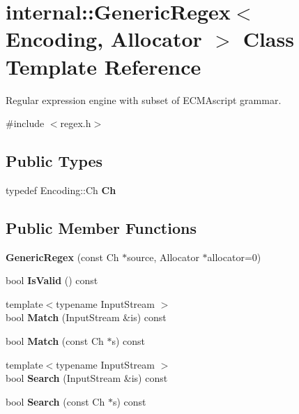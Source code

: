 \hypertarget{classinternal_1_1GenericRegex}{}\section{internal\+:\+:Generic\+Regex$<$ Encoding, Allocator $>$ Class Template Reference}
\label{classinternal_1_1GenericRegex}


Regular expression engine with subset of E\+C\+M\+Ascript grammar.  




{\ttfamily \#include $<$regex.\+h$>$}

\subsection*{Public Types}
\begin{DoxyCompactItemize}
\item 
\mbox{\label{classinternal_1_1GenericRegex_a44e1a86ec27e1c5628a7d91c8c3daace}} 
typedef Encoding\+::\+Ch {\bfseries Ch}
\end{DoxyCompactItemize}
\subsection*{Public Member Functions}
\begin{DoxyCompactItemize}
\item 
\mbox{\label{classinternal_1_1GenericRegex_a35c3a49bc4545a991ab039858227df0f}} 
{\bfseries Generic\+Regex} (const Ch $\ast$source, Allocator $\ast$allocator=0)
\item 
\mbox{\label{classinternal_1_1GenericRegex_a34ddb18fa3a2c70203d0fb740443c2a8}} 
bool {\bfseries Is\+Valid} () const
\item 
\mbox{\label{classinternal_1_1GenericRegex_ac2afbb42c4280a88fbb7d6ba78dfe863}} 
{\footnotesize template$<$typename Input\+Stream $>$ }\\bool {\bfseries Match} (Input\+Stream \&is) const
\item 
\mbox{\label{classinternal_1_1GenericRegex_a24c54a41023bad6c29d36775c6479d17}} 
bool {\bfseries Match} (const Ch $\ast$s) const
\item 
\mbox{\label{classinternal_1_1GenericRegex_a97f202c0a25aff38ec9bf484cd072a74}} 
{\footnotesize template$<$typename Input\+Stream $>$ }\\bool {\bfseries Search} (Input\+Stream \&is) const
\item 
\mbox{\label{classinternal_1_1GenericRegex_a2019586ca8bb0a2e7d19363342f28aae}} 
bool {\bfseries Search} (const Ch $\ast$s) const
\end{DoxyCompactItemize}


